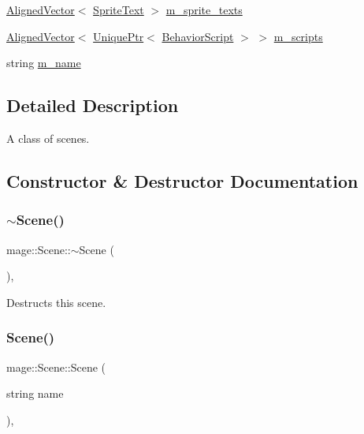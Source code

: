 \begin{DoxyCompactItemize}
\item 
\hyperlink{namespacemage_a8664bfb5ce2179fc64eae9f82c8a5ba8}{Aligned\+Vector}$<$ \hyperlink{classmage_1_1_sprite_text}{Sprite\+Text} $>$ \hyperlink{classmage_1_1_scene_aa5f239ec1cf25e48461c638ea1668b42}{m\+\_\+sprite\+\_\+texts}
\item 
\hyperlink{namespacemage_a8664bfb5ce2179fc64eae9f82c8a5ba8}{Aligned\+Vector}$<$ \hyperlink{namespacemage_a3316d7143a973e37adf1110f2e80ca31}{Unique\+Ptr}$<$ \hyperlink{classmage_1_1_behavior_script}{Behavior\+Script} $>$ $>$ \hyperlink{classmage_1_1_scene_ae57ca3aeb6b0d8b2cb8cf40334b883f8}{m\+\_\+scripts}
\item 
string \hyperlink{classmage_1_1_scene_a6cc8cb08b1853c4e3063b33a94e8fb47}{m\+\_\+name}
\end{DoxyCompactItemize}


\subsection{Detailed Description}
A class of scenes. 

\subsection{Constructor \& Destructor Documentation}
\hypertarget{classmage_1_1_scene_adc40910fdca62586659c2961fe7e7f3c}{}\label{classmage_1_1_scene_adc40910fdca62586659c2961fe7e7f3c} 
\subsubsection{\texorpdfstring{$\sim$\+Scene()}{~Scene()}}
{\footnotesize\ttfamily mage\+::\+Scene\+::$\sim$\+Scene (\begin{DoxyParamCaption}{ }\end{DoxyParamCaption})\hspace{0.3cm}{\ttfamily [virtual]}, {\ttfamily [default]}}

Destructs this scene. \hypertarget{classmage_1_1_scene_aaed505892f2a639db47e5d5767f41337}{}\label{classmage_1_1_scene_aaed505892f2a639db47e5d5767f41337} 
\subsubsection{\texorpdfstring{Scene()}{Scene()}\hspace{0.1cm}{\footnotesize\ttfamily [1/3]}}
{\footnotesize\ttfamily mage\+::\+Scene\+::\+Scene (\begin{DoxyParamCaption}\item[{string}]{name }\end{DoxyParamCaption})\hspace{0.3cm}{\ttfamily [explicit]}, {\ttfamily [protected]}}

